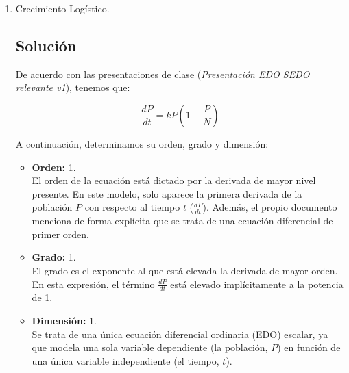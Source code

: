 \begin{enumerate}[label=\arabic*., leftmargin=*]
\begin{itemize}[leftmargin=*]
        \item \textbf{Grado:} 1.\\
        El grado es el exponente al que está elevada la derivada de mayor orden. En las tres ecuaciones, los términos diferenciales ($\frac{dx}{dt}$, $\frac{dy}{dt}$, $\frac{dz}{dt}$) están elevados implícitamente a la potencia de 1.

        \item \textbf{Dimensión:} 3.\\
        La dimensión de un sistema dinámico está dada por el número de variables de estado o ecuaciones dependientes acopladas. El modelo de Lorenz describe la evolución espacial en tres dimensiones usando tres variables dependientes ($x$, $y$, $z$) respecto a una sola variable independiente (el tiempo, $t$), por lo que se trata de un sistema de dimensión 3.
    \end{itemize}
    
    \item Crecimiento Logístico.
    
    \subsection{Solución}

    De acuerdo con las presentaciones de clase (\textit{Presentación EDO SEDO relevante v1}), tenemos que:

    \[ \frac{dP}{dt} = kP \left( 1 - \frac{P}{N} \right) \]

    A continuación, determinamos su orden, grado y dimensión:

    \begin{itemize}[leftmargin=*]
        \item \textbf{Orden:} 1.\\
        El orden de la ecuación está dictado por la derivada de mayor nivel presente. En este modelo, solo aparece la primera derivada de la población $P$ con respecto al tiempo $t$ ($\frac{dP}{dt}$). Además, el propio documento menciona de forma explícita que se trata de una ecuación diferencial de primer orden.

        \item \textbf{Grado:} 1.\\
        El grado es el exponente al que está elevada la derivada de mayor orden. En esta expresión, el término $\frac{dP}{dt}$ está elevado implícitamente a la potencia de 1.

        \item \textbf{Dimensión:} 1.\\
        Se trata de una única ecuación diferencial ordinaria (EDO) escalar, ya que modela una sola variable dependiente (la población, $P$) en función de una única variable independiente (el tiempo, $t$).
    \end{itemize}
    

\end{enumerate}
